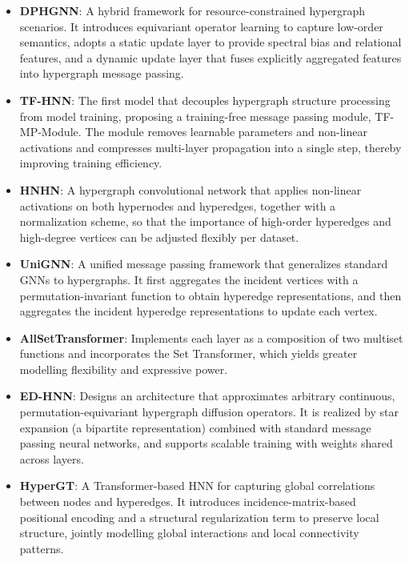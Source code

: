 \begin{itemize}
    \item \textbf{DPHGNN}\cite{saxena2024dphgnn}: A hybrid framework for resource-constrained hypergraph scenarios. It introduces equivariant operator learning to capture low-order semantics, adopts a static update layer to provide spectral bias and relational features, and a dynamic update layer that fuses explicitly aggregated features into hypergraph message passing.
    \item \textbf{TF-HNN}\cite{tang2025training}: The first model that decouples hypergraph structure processing from model training, proposing a training-free message passing module, TF-MP-Module. The module removes learnable parameters and non-linear activations and compresses multi-layer propagation into a single step, thereby improving training efficiency.
    
    \vspace{0.5em} %
    
    \item \textbf{HNHN}\cite{dong2020hnhn}: A hypergraph convolutional network that applies non-linear activations on both hypernodes and hyperedges, together with a normalization scheme, so that the importance of high-order hyperedges and high-degree vertices can be adjusted flexibly per dataset.
    \item \textbf{UniGNN}\cite{huang2021unignn}: A unified message passing framework that generalizes standard GNNs to hypergraphs. It first aggregates the incident vertices with a permutation-invariant function to obtain hyperedge representations, and then aggregates the incident hyperedge representations to update each vertex.
    \item \textbf{AllSetTransformer}\cite{chien2022you,lee2019set}: Implements each layer as a composition of two multiset functions and incorporates the Set Transformer, which yields greater modelling flexibility and expressive power.
    \item \textbf{ED-HNN}\cite{wang2023equivariant}: Designs an architecture that approximates arbitrary continuous, permutation-equivariant hypergraph diffusion operators. It is realized by star expansion (a bipartite representation) combined with standard message passing neural networks, and supports scalable training with weights shared across layers.
    \item \textbf{HyperGT}\cite{liu2024hypergraph}: A Transformer-based HNN for capturing global correlations between nodes and hyperedges. It introduces incidence-matrix-based positional encoding and a structural regularization term to preserve local structure, jointly modelling global interactions and local connectivity patterns.
    

\end{itemize}
